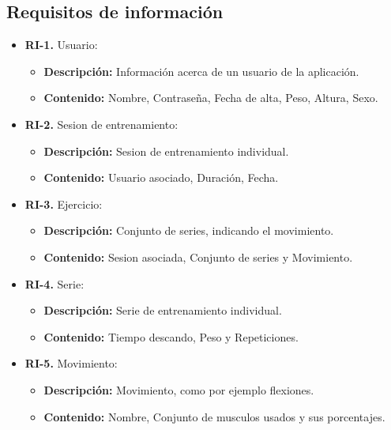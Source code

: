 \subsection{Requisitos de información}
\begin{itemize}
  \item \textbf{RI-1.} Usuario:
  \begin{itemize}
    \item \textbf{Descripción:} Información acerca de un usuario de la aplicación.
    
    \item \textbf{Contenido:} Nombre, Contraseña, Fecha de alta, Peso, Altura, Sexo.
  \end{itemize}
  \item \textbf{RI-2.} Sesion de entrenamiento:
    \begin{itemize}
    \item \textbf{Descripción:} Sesion de entrenamiento individual.
    \item \textbf{Contenido:} Usuario asociado, Duración, Fecha.
  \end{itemize}
  \item \textbf{RI-3.} Ejercicio:
    \begin{itemize}
    \item \textbf{Descripción:}  Conjunto de series, indicando el movimiento.
    \item \textbf{Contenido:}  Sesion asociada, Conjunto de series y Movimiento.
  \end{itemize}
  \item \textbf{RI-4.} Serie:
    \begin{itemize}
    \item \textbf{Descripción:} Serie de entrenamiento individual.
    \item \textbf{Contenido:} Tiempo descando, Peso y  Repeticiones.
  \end{itemize}
  \item \textbf{RI-5.} Movimiento:
    \begin{itemize}
    \item \textbf{Descripción:}  Movimiento, como por ejemplo flexiones.
    \item \textbf{Contenido:}  Nombre, Conjunto de musculos usados y sus porcentajes.
  \end{itemize}
\end{itemize}




  
